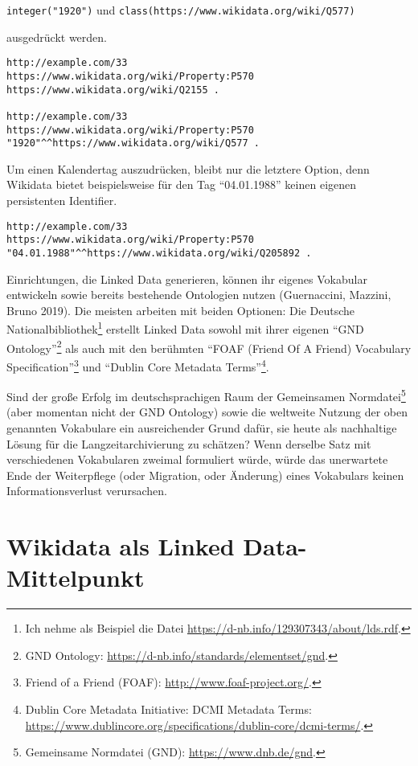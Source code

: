 \documentclass[a4paper,
fontsize=11pt,
oneside,
numbers=noperiodatend,
parskip=half-,
bibliography=totoc,
final
]{scrartcl}
\begin{document}
\texttt{integer("1920")} und
\texttt{class(https://www.wikidata.org/wiki/Q577)}

ausgedrückt werden.

\begin{verbatim}
http://example.com/33
https://www.wikidata.org/wiki/Property:P570
https://www.wikidata.org/wiki/Q2155 .

http://example.com/33
https://www.wikidata.org/wiki/Property:P570
"1920"^^https://www.wikidata.org/wiki/Q577 .
\end{verbatim}

Um einen Kalendertag auszudrücken, bleibt nur die letztere Option, denn
Wikidata bietet beispielsweise für den Tag \enquote{04.01.1988} keinen
eigenen persistenten Identifier.

\begin{verbatim}
http://example.com/33
https://www.wikidata.org/wiki/Property:P570
"04.01.1988"^^https://www.wikidata.org/wiki/Q205892 .
\end{verbatim}

Einrichtungen, die Linked Data generieren, können ihr eigenes Vokabular
entwickeln sowie bereits bestehende Ontologien nutzen (Guernaccini,
Mazzini, Bruno 2019). Die meisten arbeiten mit beiden Optionen: Die
Deutsche Nationalbibliothek\footnote{Ich nehme als Beispiel die Datei
  \url{https://d-nb.info/129307343/about/lds.rdf}.} erstellt Linked Data
sowohl mit ihrer eigenen \enquote{GND Ontology}\footnote{GND Ontology:
  \url{https://d-nb.info/standards/elementset/gnd}.} als auch mit den
berühmten \enquote{FOAF (Friend Of A Friend) Vocabulary
Specification}\footnote{Friend of a Friend (FOAF):
  \url{http://www.foaf-project.org/}.} und \enquote{Dublin Core Metadata
Terms}\footnote{Dublin Core Metadata Initiative: DCMI Metadata Terms:
  \url{https://www.dublincore.org/specifications/dublin-core/dcmi-terms/}.}.

Sind der große Erfolg im deutschsprachigen Raum der Gemeinsamen
Normdatei\footnote{Gemeinsame Normdatei (GND):
  \url{https://www.dnb.de/gnd}.} (aber momentan nicht der GND Ontology)
sowie die weltweite Nutzung der oben genannten Vokabulare ein
ausreichender Grund dafür, sie heute als nachhaltige Lösung für die
Langzeitarchivierung zu schätzen? Wenn derselbe Satz mit verschiedenen
Vokabularen zweimal formuliert würde, würde das unerwartete Ende der
Weiterpflege (oder Migration, oder Änderung) eines Vokabulars keinen
Informationsverlust verursachen.

\hypertarget{wikidata-als-linked-data-mittelpunkt}{%
\section{Wikidata als Linked
Data-Mittelpunkt}\label{wikidata-als-linked-data-mittelpunkt}}
\end{document}
